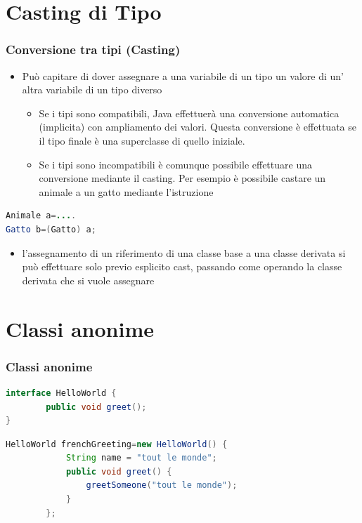 \documentclass{beamer}
\begin{document}
\section{Casting di Tipo}
\begin{frame}[fragile]
\frametitle{Conversione tra tipi (Casting)}
\begin{itemize}
\item Pu\`o capitare di dover assegnare a una variabile di un tipo un valore di un' altra variabile di un tipo diverso
\begin{itemize}
\item Se i tipi sono compatibili, Java effettuerà una conversione automatica (implicita) con ampliamento dei valori. Questa conversione \`e effettuata se il tipo finale \`e una superclasse di quello iniziale. 
\item Se i tipi sono incompatibili \`e comunque possibile effettuare una conversione mediante il casting. Per esempio \`e possibile castare un animale a un gatto mediante l'istruzione
\end{itemize}

\end{itemize}
\begin{lstlisting}[language=Java,escapechar=|]
Animale a=....
Gatto b=(Gatto) a;
\end{lstlisting}
\begin{itemize}
 \item l'assegnamento di un riferimento di una classe base a una classe derivata si pu\`o effettuare solo previo esplicito cast, passando come operando la classe derivata che si vuole assegnare
\end{itemize}
\end{frame}

\section{Classi anonime}

\begin{frame}[fragile]
\frametitle{Classi anonime }

\begin{lstlisting}[language=Java,escapechar=|]
 interface HelloWorld {
        public void greet();
}
\end{lstlisting}

\begin{lstlisting}[language=Java,escapechar=|]
 HelloWorld frenchGreeting=new HelloWorld() {
            String name = "tout le monde";
            public void greet() {
                greetSomeone("tout le monde");
            }
        };
\end{lstlisting}
\end{frame}
\end{document}
